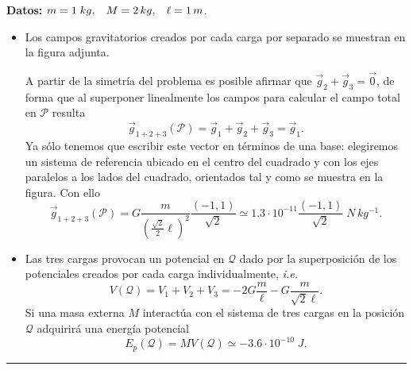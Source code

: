 \documentclass[a4paper,14pt]{exam}
\newcommand{\halmos}{\vspace*{-7mm}
	
					\begin{flushright}
						\rule{1mm}{2.5mm} 
					\end{flushright}\vspace*{-6mm}
						
					  }
\renewcommand{\qed}{\halmos}
\begin{document}
\begin{enumerate}
\begin{minipage}{.7\linewidth}
\begin{itemize}
		\end{itemize}
 		\end{minipage}\hfill
 		\begin{minipage}{.3\linewidth}
 		\raggedleft
 			\def\svgwidth{.85\linewidth}
			
 		\end{minipage}
 		\begin{small}
				
			\textbf{Datos:} $m=1\;kg,\hspace{3mm}M=2\,kg,\hspace{3mm}\ell=1\,m$.
			\end{small}
		
		
		\begin{mdframed}[backgroundcolor=brown!10]
			\begin{itemize}
				\item[a)]
				 Los campos gravitatorios creados por cada carga por separado se muestran en la figura adjunta. 	
			 				{\center
 				\def\svgwidth{.3\linewidth}
				
				}
				\vspace{1ex}
					 
				 
				 A partir de la simetría del problema es posible afirmar que $\vec{g}_2+\vec{g}_3=\vec{0}$, de forma que al superponer linealmente los campos para calcular el campo total en $\mathcal{P}$ resulta
				$$\vec{g}_{1+2+3}(\mathcal{P})=\vec
				g_1+\vec g_2+\vec g_3=\vec{g}_1.$$
				Ya sólo tenemos que escribir este vector en términos de una base: elegiremos un sistema de referencia ubicado en el centro del cuadrado y con los ejes paralelos a los lados del cuadrado, orientados tal y como se muestra en la figura. Con ello
				$$\vec{g}_{1+2+3}(\mathcal{P})= G\frac{m}{\left(\frac{\sqrt{2}}{2}\ell\right)^2}\frac{(-1,1)}{\sqrt{2}}\simeq 1.3\cdot 10^{-11}\frac{(-1,1)}{\sqrt{2}}\;N\,kg^{-1}.$$
				
			\end{itemize}
			\end{mdframed}
\newpage
{}

			\begin{mdframed}[backgroundcolor=brown!10]
				\begin{itemize}

					\item[b)] Las tres cargas provocan un potencial en $\mathcal{Q}$ dado por la superposición de los potenciales creados por cada carga individualmente, \textit{i.e.}
					$$V(\mathcal{Q})=V_1+V_2+V_3=-2G\frac{m}{\ell}-G\frac{m}{\sqrt{2}\ell}.$$
					Si una masa externa $M$ interactúa con el sistema de tres cargas en la posición $\mathcal{Q}$ adquirirá una energía potencial 
					$$\boxed{E_p(\mathcal{Q})=MV(\mathcal{Q})\simeq -3.6\cdot 10^{-10}\;J.}$$
				\end{itemize}
			\end{mdframed}			
			
		\qed
	
		
		
	
		
\end{enumerate}		
 
\end{document}
